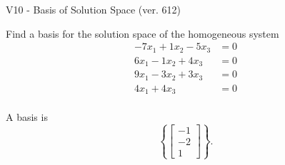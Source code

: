 \begin{exercise}
  \begin{exerciseTitle}V10 - Basis of Solution Space (ver. 612)\end{exerciseTitle}
  \begin{exerciseStatement}
    Find a basis for the solution space of the homogeneous system 
\begin{align*}
 -7 x_ 1 + 1 x_ 2 -5 x_ 3 &= 0  \\ 
  6 x_ 1 -1 x_ 2 + 4 x_ 3 &= 0  \\ 
  9 x_ 1 -3 x_ 2 + 3 x_ 3 &= 0  \\ 
  4 x_ 1 + 4 x_ 3 &= 0  \\ 
 \end{align*}


 
  \end{exerciseStatement}

  \begin{exerciseAnswer}
   A basis is   
\[\left\{\left[\begin{array}{c}
-1 \\
-2 \\
1
\end{array}\right]\right\}.\]

  


  \end{exerciseAnswer}
\end{exercise}